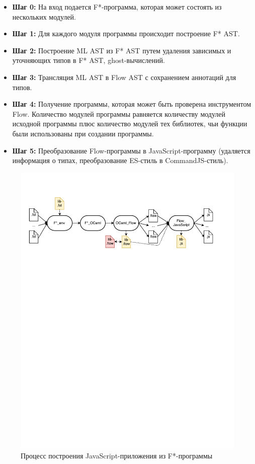 \documentclass[12pt]{matmex-diploma}
\begin{document}
\begin{itemize}
\item \textbf{Шаг 0:} На вход подается F*-программа, которая может состоять из нескольких модулей. 
\item \textbf{Шаг 1:} Для каждого модуля программы происходит построение F* AST.
\item \textbf{Шаг 2:} Построение ML AST из F* AST путем удаления зависимых и уточняющих типов в F* AST, ghost-вычислений.
\item \textbf{Шаг 3:} Трансляция ML AST в Flow AST с сохранением аннотаций для типов.
\item \textbf{Шаг 4:} Получение программы, которая может быть проверена инструментом Flow. Количество модулей программы равняется количеству модулей исходной программы плюс количество модулей тех библиотек, чьи функции были использованы при создании программы. 
\item \textbf{Шаг 5:} Преобразование Flow-программы в JavaScript-программу (удаляется информация о типах, преобразование ES-стиль в CommandJS-стиль).
\end{itemize}

\begin{figure}[h!]
\begin{center}
\includegraphics[width=\textwidth]{Workflow}
\caption{Процесс построения JavaScript-приложения из F*-программы}
\label{fig:modules} 
\end{center}
\end{figure}
\end{document}
